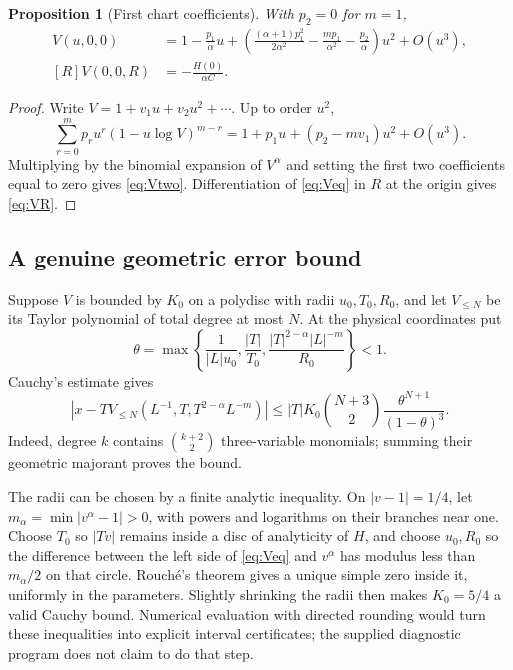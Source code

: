 \documentclass[11pt,a4paper]{article}
\numberwithin{equation}{section}
\newtheorem{proposition}[theorem]{Proposition}
\theoremstyle{definition}\newtheorem{definition}[theorem]{Definition}
\theoremstyle{remark}\newtheorem{remark}[theorem]{Remark}
\theoremstyle{definition}
\begin{document}
\begin{proposition}[First chart coefficients]\label{prop:chartcoeff}
With $p_2=0$ for $m=1$,
\begin{align}
 V(u,0,0)
 &=1-\frac{p_1}{\alpha}u
 +\left(\frac{(\alpha+1)p_1^2}{2\alpha^2}
        -\frac{mp_1}{\alpha^2}-\frac{p_2}{\alpha}\right)u^2+O(u^3),
 \label{eq:Vtwo}\\
 [R]V(0,0,R)&=-\frac{H(0)}{\alpha C}.\label{eq:VR}
\end{align}
\end{proposition}
\begin{proof}
Write $V=1+v_1u+v_2u^2+\cdots$. Up to order $u^2$,
\[
 \sum_{r=0}^m p_r u^r(1-u\log V)^{m-r}
 =1+p_1u+(p_2-mv_1)u^2+O(u^3).
\]
Multiplying by the binomial expansion of $V^\alpha$ and setting the first
two coefficients equal to zero gives \eqref{eq:Vtwo}. Differentiation of
\eqref{eq:Veq} in $R$ at the origin gives \eqref{eq:VR}.
\end{proof}

\subsection{A genuine geometric error bound}
Suppose $V$ is bounded by $K_0$ on a polydisc with radii $u_0,T_0,R_0$,
and let $V_{\le N}$ be its Taylor polynomial of total degree at most $N$.
At the physical coordinates put
\[
 \theta=\max\left\{\frac1{|L| u_0},\frac{|T|}{T_0},
              \frac{|T|^{2-\alpha}|L|^{-m}}{R_0}\right\}<1.
\]
Cauchy's estimate gives
\begin{equation}\label{eq:geometric}
 \left|x-T V_{\le N}(L^{-1},T,T^{2-\alpha}L^{-m})\right|
 \le |T|K_0\binom{N+3}{2}\frac{\theta^{N+1}}{(1-\theta)^3}.
\end{equation}
Indeed, degree $k$ contains $\binom{k+2}{2}$ three-variable monomials;
summing their geometric majorant proves the bound.

The radii can be chosen by a finite analytic inequality. On
$|v-1|=1/4$, let $m_\alpha=\min|v^\alpha-1|>0$, with powers and logarithms
on their branches near one. Choose $T_0$ so $|Tv|$ remains inside a disc
of analyticity of $H$, and choose $u_0,R_0$ so the difference between the
left side of \eqref{eq:Veq} and $v^\alpha$ has modulus less than
$m_\alpha/2$ on that circle. Rouch\'e's theorem gives a unique simple zero
inside it, uniformly in the parameters. Slightly shrinking the radii then
makes $K_0=5/4$ a valid Cauchy bound. Numerical evaluation with directed
rounding would turn these inequalities into explicit interval certificates;
the supplied diagnostic program does not claim to do that step.
\end{document}
